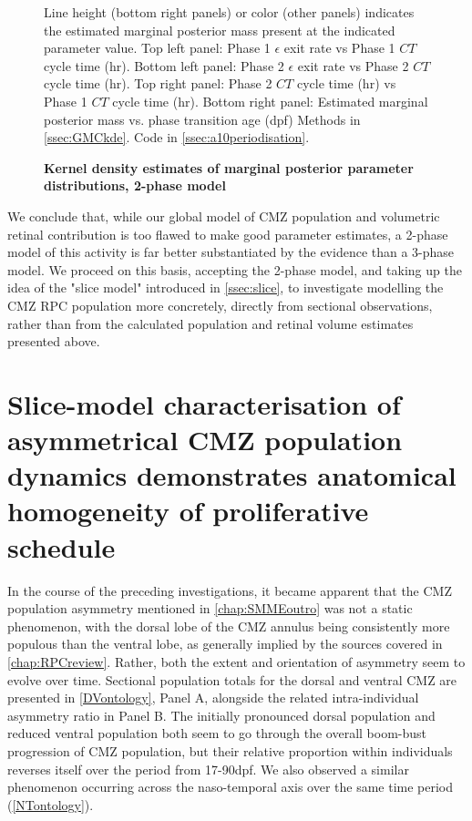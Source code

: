 \begin{figure}[!h]
    \caption{{\bf Kernel density estimates of marginal posterior parameter distributions, 2-phase model}}
    Line height (bottom right panels) or color (other panels) indicates the estimated marginal posterior mass present at the indicated parameter value.
    Top left panel: Phase 1 $\epsilon$ exit rate vs Phase 1 $CT$ cycle time (hr).
    Bottom left panel: Phase 2 $\epsilon$ exit rate vs Phase 2 $CT$ cycle time (hr).
    Top right panel: Phase 2 $CT$ cycle time (hr) vs Phase 1 $CT$ cycle time (hr).
    Bottom right panel: Estimated marginal posterior mass vs. phase transition age (dpf)
    \label{phasemarginals}
    Methods in \autoref{ssec:GMCkde}.
    Code in \autoref{ssec:a10periodisation}.    
\end{figure}

We conclude that, while our global model of CMZ population and volumetric retinal contribution is too flawed to make good parameter estimates, a 2-phase model of this activity is far better substantiated by the evidence than a 3-phase model. We proceed on this basis, accepting the 2-phase model, and taking up the idea of the "slice model" introduced in \autoref{ssec:slice}, to investigate modelling the CMZ RPC population more concretely, directly from sectional observations, rather than from the calculated population and retinal volume estimates presented above.

\section{Slice-model characterisation of asymmetrical CMZ population dynamics demonstrates anatomical homogeneity of proliferative schedule}
\label{sec:sliceGMC}

In the course of the preceding investigations, it became apparent that the CMZ population asymmetry mentioned in \autoref{chap:SMMEoutro} was not a static phenomenon, with the dorsal lobe of the CMZ annulus being consistently more populous than the ventral lobe, as generally implied by the sources covered in \autoref{chap:RPCreview}. Rather, both the extent and orientation of asymmetry seem to evolve over time. Sectional population totals for the dorsal and ventral CMZ are presented in \autoref{DVontology}, Panel A, alongside the related intra-individual asymmetry ratio in Panel B. The initially pronounced dorsal population and reduced ventral population both seem to go through the overall boom-bust progression of CMZ population, but their relative proportion within individuals reverses itself over the period from 17-90dpf. We also observed a similar phenomenon occurring across the naso-temporal axis over the same time period (\autoref{NTontology}).

